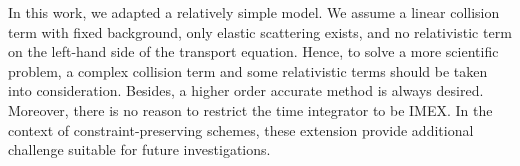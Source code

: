In this work, we adapted a relatively simple model. 
We assume a linear collision term with fixed background, only elastic scattering exists, and no relativistic term on the left-hand side of the transport equation.
Hence, to solve a more scientific problem, a complex collision term and some relativistic terms should be taken into consideration.
Besides, a higher order accurate method is always desired.
Moreover, there is no reason to restrict the time integrator to be IMEX.
In the context of constraint-preserving schemes, these extension provide additional challenge suitable for future investigations.